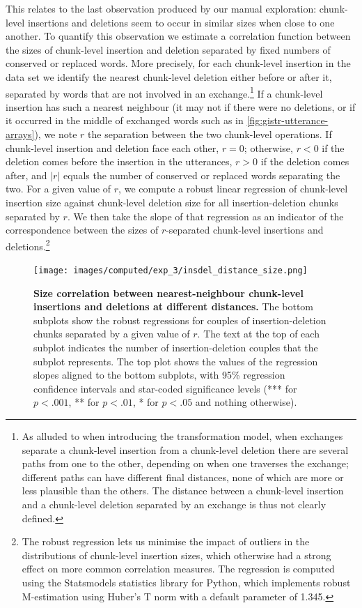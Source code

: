 This relates to the last observation produced by our manual exploration:
chunk-level insertions and deletions seem to occur in similar sizes when
close to one another. To quantify this observation we estimate a
correlation function between the sizes of chunk-level insertion and
deletion separated by fixed numbers of conserved or replaced words. More
precisely, for each chunk-level insertion in the data set we identify
the nearest chunk-level deletion either before or after it, separated by
words that are not involved in an exchange.\footnote{As alluded to when
  introducing the transformation model, when exchanges separate a
  chunk-level insertion from a chunk-level deletion there are several
  paths from one to the other, depending on when one traverses the
  exchange; different paths can have different final distances, none of
  which are more or less plausible than the others. The distance between
  a chunk-level insertion and a chunk-level deletion separated by an
  exchange is thus not clearly defined.} If a chunk-level insertion has
such a nearest neighbour (it may not if there were no deletions, or if
it occurred in the middle of exchanged words such as in
\cref{fig:gistr-utterance-arrays}), we note \(r\) the separation between
the two chunk-level operations. If chunk-level insertion and deletion
face each other, \(r = 0\); otherwise, \(r < 0\) if the deletion comes
before the insertion in the utterances, \(r > 0\) if the deletion comes
after, and \(|r|\) equals the number of conserved or replaced words
separating the two. For a given value of \(r\), we compute a robust
linear regression of chunk-level insertion size against chunk-level
deletion size for all insertion-deletion chunks separated by \(r\). We
then take the slope of that regression as an indicator of the
correspondence between the sizes of \(r\)-separated chunk-level
insertions and deletions.\footnote{The robust regression lets us
  minimise the impact of outliers in the distributions of chunk-level
  insertion sizes, which otherwise had a strong effect on more common
  correlation measures. The regression is computed using the Statsmodels
  statistics library for Python, which implements robust M-estimation
  using Huber's T norm \autocite{huber_robust_1981} with a default
  parameter of 1.345.}

\begin{figure}[!ht]
  \centering
  \texttt{[image: images/computed/exp\_3/insdel\_distance\_size.png]}
  \caption[Size correlation between nearest-neighbour chunk-level insertions and deletions at different distances]{
  \textbf{Size correlation between nearest-neighbour chunk-level insertions and deletions at different distances.}
  The bottom subplots show the robust regressions for couples of insertion-deletion chunks separated by a given value of $r$.
  The text at the top of each subplot indicates the number of insertion-deletion couples that the subplot represents.
  The top plot shows the values of the regression slopes aligned to the bottom subplots, with 95\% regression confidence intervals and star-coded significance levels (*** for $p < .001$, ** for $p < .01$, * for $p < .05$ and nothing otherwise).
  }
  \label{fig:gistr-insdel-correlations}
\end{figure}

